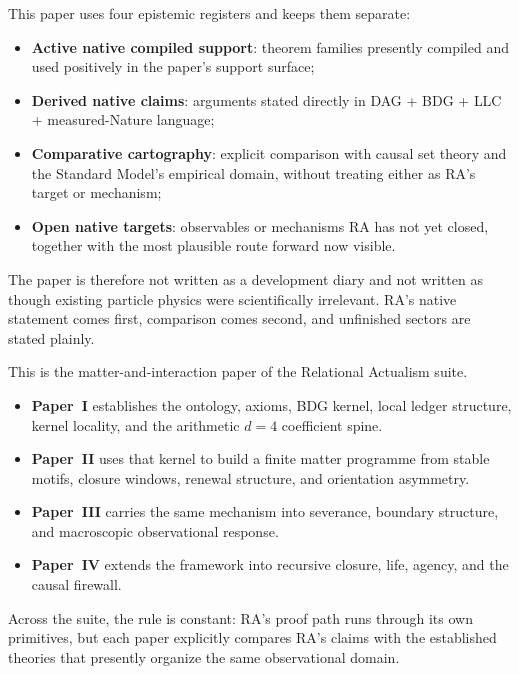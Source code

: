 \documentclass[11pt]{article}
\begin{document}
\begin{tcolorbox}[title=Epistemic Status of This Paper,colback=gray!5,colframe=gray!60]
This paper uses four epistemic registers and keeps them separate:
\begin{itemize}[nosep]
    \item \textbf{Active native compiled support}: theorem families presently compiled and used positively in the paper's support surface;
    \item \textbf{Derived native claims}: arguments stated directly in DAG + BDG + LLC + measured-Nature language;
    \item \textbf{Comparative cartography}: explicit comparison with causal set theory and the Standard Model's empirical domain, without treating either as RA's target or mechanism;
    \item \textbf{Open native targets}: observables or mechanisms RA has not yet closed, together with the most plausible route forward now visible.
\end{itemize}
The paper is therefore not written as a development diary and not written as though existing particle physics were scientifically irrelevant. RA's native statement comes first, comparison comes second, and unfinished sectors are stated plainly.
\end{tcolorbox}

\begin{tcolorbox}[title=Place of This Paper in the RA Suite,colback=gray!5,colframe=gray!60]
This is the matter-and-interaction paper of the Relational Actualism suite.
\begin{itemize}[nosep]
    \item \textbf{Paper~I} establishes the ontology, axioms, BDG kernel, local ledger structure, kernel locality, and the arithmetic $d=4$ coefficient spine.
    \item \textbf{Paper~II} uses that kernel to build a finite matter programme from stable motifs, closure windows, renewal structure, and orientation asymmetry.
    \item \textbf{Paper~III} carries the same mechanism into severance, boundary structure, and macroscopic observational response.
    \item \textbf{Paper~IV} extends the framework into recursive closure, life, agency, and the causal firewall.
\end{itemize}
Across the suite, the rule is constant: RA's proof path runs through its own primitives, but each paper explicitly compares RA's claims with the established theories that presently organize the same observational domain.
\end{tcolorbox}
\end{document}
